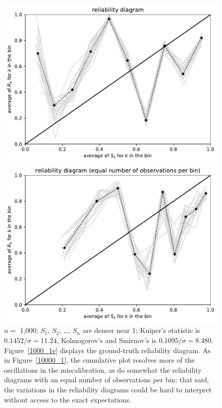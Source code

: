 \documentclass{article}
\begin{document}
\begin{figure}
\begin{centering}
\parbox{\imsize}{\includegraphics[width=\imsize]
                {./codes/unweighted/1000_10_2_1/equiprob.pdf}}
\quad\quad
\parbox{\imsize}{\includegraphics[width=\imsize]
                {./codes/unweighted/1000_10_2_1/equisamp.pdf}}

\end{centering}
\caption{$n =$ 1,000; $S_1$, $S_2$, \dots, $S_n$ are denser near 1;
         Kuiper's statistic is $0.1452 / \sigma = 11.24$,
         Kolmogorov's and Smirnov's is $0.1095 / \sigma = 8.480$.
Figure~\ref{1000_1e} displays the ground-truth reliability diagram.
As in Figure~\ref{10000_1},
the cumulative plot resolves more of the oscillations in the miscalibration,
as do somewhat the reliability diagrams with an equal number
of observations per bin; that said, the variations in the reliability diagrams
could be hard to interpret without access to the exact expectations.
}
\label{1000_1}
\end{figure}
\end{document}
